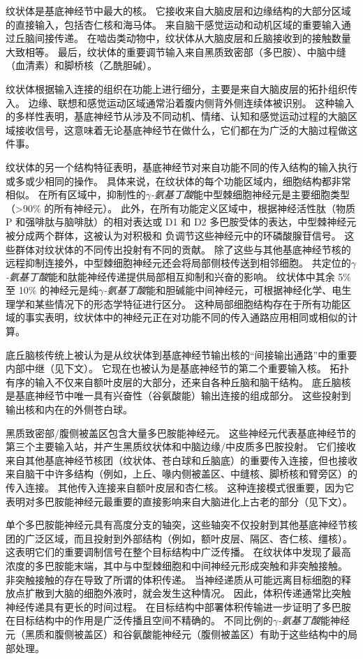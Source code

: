 纹状体是基底神经节中最大的核。
它接收来自大脑皮层和边缘结构的大部分区域的直接输入，包括杏仁核和海马体。
来自脑干感觉运动和动机区域的重要输入通过丘脑间接传递。
在啮齿类动物中，纹状体从大脑皮层和丘脑接收到的接触数量大致相等。
最后，纹状体的重要调节输入来自黑质致密部（多巴胺）、中脑中缝（血清素）和脚桥核（乙酰胆碱）。


纹状体根据输入连接的组织在功能上进行细分，主要是来自大脑皮层的拓扑组织传入。
边缘、联想和感觉运动区域通常沿着腹内侧背外侧连续体被识别。
这种输入的多样性表明，基底神经节从涉及不同动机、情绪、认知和感觉运动过程的大脑区域接收信号，这意味着无论基底神经节在做什么，它们都在为广泛的大脑过程做这件事。


纹状体的另一个结构特征表明，基底神经节对来自功能不同的传入结构的输入执行或多或少相同的操作。
具体来说，在纹状体的每个功能区域内，细胞结构都非常相似。
在所有区域中，抑制性的\textit{$\gamma$-氨基丁酸}能中型棘细胞神经元是主要细胞类型（>90\% 的所有神经元）。
此外，在所有功能定义区域中，根据神经活性肽（物质 P 和强啡肽与脑啡肽）的相对表达或 D1 和 D2 多巴胺受体的表达，中型棘神经元被分成两个群体，这被认为对积极和 负调节这些神经元中的环磷酸腺苷信号。
这些群体对纹状体的不同传出投射有不同的贡献。
除了这些与其他基底神经节核的远程抑制连接外，中型棘细胞神经元还会将局部侧枝传送到相邻细胞。
共定位的\textit{$\gamma$-氨基丁酸}能和肽能神经传递提供局部相互抑制和兴奋的影响。
纹状体中其余 5\% 至 10\% 的神经元是纯\textit{$\gamma$-氨基丁酸}能和胆碱能中间神经元，可根据神经化学、电生理学和某些情况下的形态学特征进行区分。
这种局部细胞结构存在于所有功能区域的事实表明，纹状体中的神经元正在对功能不同的传入通路应用相同或相似的计算。


底丘脑核传统上被认为是从纹状体到基底神经节输出核的“间接输出通路”中的重要内部中继（见下文）。
它现在也被认为是基底神经节的第二个重要输入核。
拓扑有序的输入不仅来自额叶皮层的大部分，还来自各种丘脑和脑干结构。
底丘脑核是基底神经节中唯一具有兴奋性（谷氨酸能）输出连接的组成部分。
这些投射到输出核和内在的外侧苍白球。


黑质致密部/腹侧被盖区包含大量多巴胺能神经元。
这些神经元代表基底神经节的第三个主要输入站，并产生黑质纹状体和中脑边缘/中皮质多巴胺投射。
它们接收来自其他基底神经节核团（纹状体、苍白球和丘脑底）的重要传入连接，但也接收来自脑干中许多结构（例如，上丘、喙内侧被盖区、中缝核、脚桥核和臂旁区）的传入连接。
其他传入连接来自额叶皮层和杏仁核。
这种连接模式很重要，因为它表明对多巴胺能神经元最重要的直接影响来自大脑进化上古老的部分（见下文）。


单个多巴胺能神经元具有高度分支的轴突，这些轴突不仅投射到其他基底神经节核团的广泛区域，而且投射到外部结构（例如，额叶皮层、隔区、杏仁核、缰核）。
这表明它们的重要调制信号在整个目标结构中广泛传播。 在纹状体中发现了最高浓度的多巴胺能末端，其中与中型棘细胞和中间神经元形成突触和非突触接触。
非突触接触的存在导致了所谓的体积传递。
当神经递质从可能远离目标细胞的释放点扩散到大脑的细胞外液时，就会发生这种情况。
因此，体积传递通常比突触神经传递具有更长的时间过程。
在目标结构中部署体积传输进一步证明了多巴胺在目标结构中的作用是广泛传播且空间不精确的。
不同比例的\textit{$\gamma$-氨基丁酸}能神经元（黑质和腹侧被盖区）和谷氨酸能神经元（腹侧被盖区）有助于这些结构中的局部处理。



